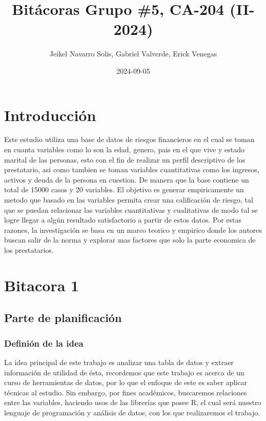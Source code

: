 \documentclass[
  letterpaper,
  DIV=11,
  numbers=noendperiod]{scrreprt}
\title{Bitácoras Grupo \#5, CA-204 (II-2024)}
\author{Jeikel Navarro Solis, Gabriel Valverde, Erick Venegas}
\date{2024-09-05}
\renewcommand*\contentsname{Tabla de contenidos}
\newcommand\contentsname{Tabla de contenidos}
\begin{document}
\maketitle

\renewcommand*\contentsname{Tabla de contenidos}
{
\hypersetup{linkcolor=}
\setcounter{tocdepth}{2}
\tableofcontents
}


\chapter*{Introducción}\label{introducciuxf3n}


Este estudio utiliza una base de datos de riesgos financieros en el cual
se toman en cuanta variables como lo son la edad, genero, pais en el que
vive y estado marital de las personas, esto con el fin de realizar un
perfil descriptivo de los prestatario, asi como tambien se toman
variables cuantitativas como los ingresos, activos y deuda de la persona
en cuestion. De manera que la base contiene un total de 15000 casos y 20
variables. El objetivo es generar empiricamente un metodo que basado en
las variables permita crear una calificación de riesgo, tal que se
puedan relacionar las variables cuantitativas y cualitativas de modo tal
se logre llegar a algún resultado satisfactorio a partir de estos datos.
Por estas razones, la investigación se basa en un marco teorico y
empirico donde los autores buscan salir de la norma y explorar mas
factores que solo la parte economica de los prestatarios.


\chapter{Bitacora 1}\label{bitacora-1}

\section{Parte de planificación}\label{parte-de-planificaciuxf3n}

\subsection{Definión de la idea}\label{definiuxf3n-de-la-idea}

La idea principal de este trabajo es analizar una tabla de datos y
extraer información de utilidad de ésta, recordemos que este trabajo es
acerca de un curso de herramientas de datos, por lo que el enfoque de
este es saber aplicar técnicas al estudio. Sin embargo, por fines
académicos, buscaremos relaciones entre las variables, haciendo usos de
las librerías que posee R, el cual será nuestro lenguaje de programación
y análisis de datos, con los que realizaremos el trabajo.
\end{document}
